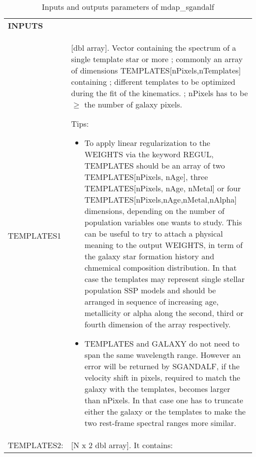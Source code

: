 \documentclass[11pt]{book}
\begin{document}
\begin{center}
\begin{longtable}{p{2.7cm}| p{11.1cm}}
\caption{Inputs and outputs parameters of mdap\_sgandalf} \label{dap_tab:mdap_sgandalf} \\
\hline
\endfirsthead
\hline
\endhead
\hline
\endlastfoot
\hline
{\bf  INPUTS} & \\
TEMPLATES1 & [dbl array].  Vector containing the spectrum of a single template star or
        more ; commonly an array of dimensions
        TEMPLATES[nPixels,nTemplates] containing ; different templates
        to be optimized during the fit of the kinematics.  ; nPixels
        has to be $\geq$ the number of galaxy pixels.  

         Tips:
           \begin{itemize}

   \item To apply linear regularization to the WEIGHTS via the
     keyword REGUL, TEMPLATES should be an array of two
     TEMPLATES[nPixels, nAge], three TEMPLATES[nPixels, nAge, nMetal]
     or four TEMPLATES[nPixels,nAge,nMetal,nAlpha] dimensions,
     depending on the number of population variables one wants to
     study.  This can be useful to try to attach a physical meaning
     to the output WEIGHTS, in term of the galaxy star formation
     history and chmemical composition distribution.  In that case
     the templates may represent single stellar population SSP
     models and should be arranged in sequence of increasing age,
     metallicity or alpha along the second, third or fourth
     dimension of the array respectively.

   \item TEMPLATES and GALAXY do not need to span the same
     wavelength range. However an error will be returned by
     SGANDALF, if the velocity shift in pixels, required to match
     the galaxy with the templates, becomes larger than nPixels. In
     that case one has to truncate either the galaxy or the
     templates to make the two rest-frame spectral ranges more
     similar.

      \end{itemize} \\
%
TEMPLATES2: &[N x 2  dbl array]. It contains:


\end{longtable}
\end{center}
\end{document}
